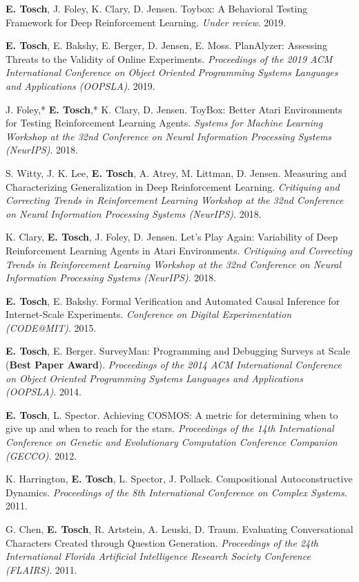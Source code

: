 \documentclass[10pt]{article}
\newcommand{\cvsec}[2]{
    \begin{tcolorbox}[width=\textwidth, breakable, title={#1}]
        #2
    \end{tcolorbox}
    \vspace{10pt}
}
\newcommand{\pub}[4]{
  \parbox{\textwidth}{
    #1. #2. \textit{#3}. #4.
    \vspace{5pt}
  }
}
\newcommand{\me}{\textbf{E. Tosch}}
\begin{document}
\cvsec{Publications}{
  \pub{\me{}, J. Foley, K. Clary, D. Jensen}{Toybox: A Behavioral Testing Framework for Deep Reinforcement Learning}{Under review}{2019}
  \pub{\me{}, E. Bakshy, E. Berger, D. Jensen, E. Moss}{PlanAlyzer: Assessing Threats to the Validity of Online Experiments}{Proceedings of the 2019 ACM International Conference on Object Oriented Programming Systems Languages and Applications (OOPSLA)}{2019}
  \pub{J. Foley,* \me{},* K. Clary, D. Jensen}{ToyBox: Better Atari Environments for Testing Reinforcement Learning Agents}{Systems for Machine Learning Workshop at the 32nd Conference on Neural Information Processing Systems (NeurIPS)}{2018}
  \pub{S. Witty, J. K. Lee, \me{}, A. Atrey, M. Littman, D. Jensen}{Measuring and Characterizing Generalization in Deep Reinforcement Learning}{Critiquing and Correcting Trends in Reinforcement Learning Workshop at the 32nd Conference on Neural Information Processing Systems (NeurIPS)}{2018}
  \pub{K. Clary, \me{}, J. Foley, D. Jensen}{Let's Play Again: Variability of Deep Reinforcement Learning Agents in Atari Environments}{Critiquing and Correcting Trends in Reinforcement Learning Workshop at the 32nd Conference on Neural Information Processing Systems (NeurIPS)}{2018}
  \pub{\me{}, E. Bakshy}{Formal Verification and Automated Causal Inference for Internet-Scale Experiments}{Conference on Digital Experimentation (CODE@MIT)}{2015}
  \pub{\me{}, E. Berger}{SurveyMan: Programming and Debugging Surveys at Scale (\textbf{Best Paper Award})}{Proceedings of the 2014 ACM International Conference on Object Oriented Programming Systems Languages and Applications (OOPSLA)}{2014}
  \pub{\me{}, L. Spector}{Achieving COSMOS: A metric for determining when to give up and when to reach for the stars}{Proceedings of the 14th International Conference on Genetic and Evolutionary Computation Conference Companion (GECCO)}{2012}
  \pub{K. Harrington, \me{}, L. Spector, J. Pollack}{Compositional Autoconstructive Dynamics}{Proceedings of the 8th International Conference on Complex Systems}{2011}
  \pub{G. Chen, \me{}, R. Artstein, A. Leuski, D. Traum}{Evaluating Conversational Characters Created through Question Generation}{Proceedings of the 24th International Florida Artificial Intelligence Research Society Conference (FLAIRS)}{2011}
}
\end{document}
